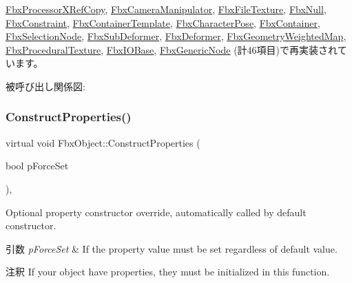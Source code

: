 \hyperlink{class_fbx_processor_x_ref_copy_a025831c438813ebe4ef619ea5b00d2fd}{Fbx\+Processor\+X\+Ref\+Copy}, \hyperlink{class_fbx_camera_manipulator_ac85c39bca662da17932613bd8bbaf95b}{Fbx\+Camera\+Manipulator}, \hyperlink{class_fbx_file_texture_a107d1612fc50f17722c77ee8df236eeb}{Fbx\+File\+Texture}, \hyperlink{class_fbx_null_afb0901136678ef0bbea8cbc9227e9ffd}{Fbx\+Null}, \hyperlink{class_fbx_constraint_a6350b98fa8717caf9167c5513824310c}{Fbx\+Constraint}, \hyperlink{class_fbx_container_template_a141e84991e5620dc97e8b77f52e019ae}{Fbx\+Container\+Template}, \hyperlink{class_fbx_character_pose_a9da449d510900348679190d90deb5a8a}{Fbx\+Character\+Pose}, \hyperlink{class_fbx_container_a65204439a64fd2184467e41d994bec0a}{Fbx\+Container}, \hyperlink{class_fbx_selection_node_aaef80cf95a8109fe5cc6263f18d7cb99}{Fbx\+Selection\+Node}, \hyperlink{class_fbx_sub_deformer_ae3d566383651e82b681827f0f38b97f3}{Fbx\+Sub\+Deformer}, \hyperlink{class_fbx_deformer_ac50e8e0e8cfd2934f8f8cca2d69a6f58}{Fbx\+Deformer}, \hyperlink{class_fbx_geometry_weighted_map_af8485ac8574bf4ac9222de920a98e81f}{Fbx\+Geometry\+Weighted\+Map}, \hyperlink{class_fbx_procedural_texture_a2386483aef2766c16c911e6fd6539d32}{Fbx\+Procedural\+Texture}, \hyperlink{class_fbx_i_o_base_aed70ed1326f8fb1cc96e2086c73722f8}{Fbx\+I\+O\+Base}, \hyperlink{class_fbx_generic_node_a63ff7b8adb2ddc1803f74b9afce50fc2}{Fbx\+Generic\+Node} (計46項目)で再実装されています。

被呼び出し関係図\+:
\mbox{\label{class_fbx_object_ad44f814323dc1b5e78bff1bfc608b4bb}} 
\subsubsection{\texorpdfstring{Construct\+Properties()}{ConstructProperties()}}
{\footnotesize\ttfamily virtual void Fbx\+Object\+::\+Construct\+Properties (\begin{DoxyParamCaption}\item[{bool}]{p\+Force\+Set }\end{DoxyParamCaption})\hspace{0.3cm}{\ttfamily [protected]}, {\ttfamily [virtual]}}

Optional property constructor override, automatically called by default constructor. 
\begin{DoxyParams}{引数}
{\em p\+Force\+Set} & If the property value must be set regardless of default value. \\
\hline
\end{DoxyParams}
\begin{DoxyRemark}{注釈}
If your object have properties, they must be initialized in this function. 
\end{DoxyRemark}


